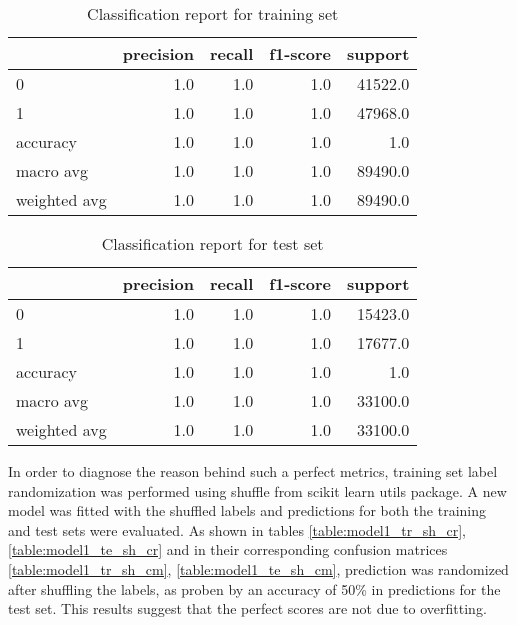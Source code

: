 \documentclass{article}
\begin{document}
{\begin{itemize}
\begin{table}[h!]
\centering
\begin{tabular}{lrrrr}
\toprule
{} &  precision &  recall &  f1-score &  support \\
\midrule
0            &        1.0 &     1.0 &       1.0 &  41522.0 \\
1            &        1.0 &     1.0 &       1.0 &  47968.0 \\
accuracy     &        1.0 &     1.0 &       1.0 &      1.0 \\
macro avg    &        1.0 &     1.0 &       1.0 &  89490.0 \\
weighted avg &        1.0 &     1.0 &       1.0 &  89490.0 \\
\bottomrule
\end{tabular}
\caption{Classification report for training set}
\label{table:model1_tr_cr}
\end{table}

\begin{table}[h!]
\centering
\begin{tabular}{lrrrr}
\toprule
{} &  precision &  recall &  f1-score &  support \\
\midrule
0            &        1.0 &     1.0 &       1.0 &  15423.0 \\
1            &        1.0 &     1.0 &       1.0 &  17677.0 \\
accuracy     &        1.0 &     1.0 &       1.0 &      1.0 \\
macro avg    &        1.0 &     1.0 &       1.0 &  33100.0 \\
weighted avg &        1.0 &     1.0 &       1.0 &  33100.0 \\
\bottomrule
\end{tabular}
\caption{Classification report for test set}
\label{table:model1_te_cr}
\end{table}

In order to diagnose the reason behind such a perfect metrics, training set label randomization was performed using shuffle from scikit learn utils package. A new model was fitted with the shuffled labels and predictions for both the training and test sets were evaluated. As shown in tables \ref{table:model1_tr_sh_cr}, \ref{table:model1_te_sh_cr} and in their corresponding confusion matrices  \ref{table:model1_tr_sh_cm}, \ref{table:model1_te_sh_cm}, prediction was randomized after shuffling the labels, as proben by an accuracy of  50\% in predictions for the test set. This results suggest that the perfect scores are not due to overfitting.
 

\end{itemize}}
\end{document}
